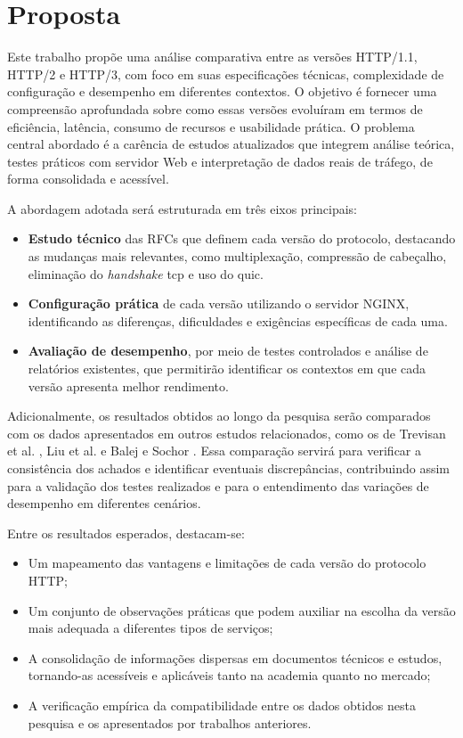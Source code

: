 \chapter{Proposta}\label{cap:proposta}

Este trabalho propõe uma análise comparativa entre as versões HTTP/1.1, HTTP/2 e HTTP/3, com foco em suas especificações técnicas, complexidade de configuração e desempenho em diferentes contextos. O objetivo é fornecer uma compreensão aprofundada sobre como essas versões evoluíram em termos de eficiência, latência, consumo de recursos e usabilidade prática. O problema central abordado é a carência de estudos atualizados que integrem análise teórica, testes práticos com servidor Web e interpretação de dados reais de tráfego, de forma consolidada e acessível.

A abordagem adotada será estruturada em três eixos principais:
\begin{itemize}
    \item \textbf{Estudo técnico} das RFCs que definem cada versão do protocolo, destacando as mudanças mais relevantes, como multiplexação, compressão de cabeçalho, eliminação do \textit{handshake} \gls{tcp} e uso do \gls{quic}.
    \item \textbf{Configuração prática} de cada versão utilizando o servidor NGINX, identificando as diferenças, dificuldades e exigências específicas de cada uma.
    \item \textbf{Avaliação de desempenho}, por meio de testes controlados e análise de relatórios existentes, que permitirão identificar os contextos em que cada versão apresenta melhor rendimento.
\end{itemize}

Adicionalmente, os resultados obtidos ao longo da pesquisa serão comparados com os dados apresentados em outros estudos relacionados, como os de Trevisan et al. \cite{trevisan2021http3}, Liu et al. \cite{liu2024http3proxy} e Balej e Sochor \cite{balej2023http3servers}. Essa comparação servirá para verificar a consistência dos achados e identificar eventuais discrepâncias, contribuindo assim para a validação dos testes realizados e para o entendimento das variações de desempenho em diferentes cenários.


Entre os resultados esperados, destacam-se:
\begin{itemize}
    \item Um mapeamento das vantagens e limitações de cada versão do protocolo HTTP;
    \item Um conjunto de observações práticas que podem auxiliar na escolha da versão mais adequada a diferentes tipos de serviços;
    \item A consolidação de informações dispersas em documentos técnicos e estudos, tornando-as acessíveis e aplicáveis tanto na academia quanto no mercado;
    \item A verificação empírica da compatibilidade entre os dados obtidos nesta pesquisa e os apresentados por trabalhos anteriores.
\end{itemize}

